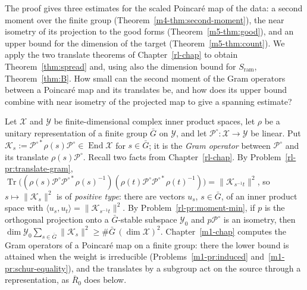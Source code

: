 \documentclass[reqno]{amsart}
\newcounter{chap}
\theoremstyle{definition}
\theoremstyle{plain}
\theoremstyle{remark}
\newcommand{\Xc}{\mathcal X}
\newcommand{\Yc}{\mathcal Y}
\newcommand{\Kc}{\mathcal K}
\newcommand{\Pc}{\mathcal P}
\newcommand{\Gb}{\bar G}
\newcommand{\Rb}{\bar R_0}
\newcommand{\Tr}{\operatorname{Tr}}
\newcommand{\Sr}{S_{\mathrm{ram}}}
\begin{document}
The proof gives three estimates for the scaled Poincar\'e map of the data: a second moment over the finite group (Theorem~\ref{m4-thm:second-moment}), the near isometry of its projection to the good forms (Theorem~\ref{m5-thm:good}), and an upper bound for the dimension of the target (Theorem~\ref{m5-thm:count}).  We apply the two translate theorems of Chapter~\ref{rl-chap} to obtain Theorem~\ref{thm:spread} and, using also the dimension bound for \(\Sr\), Theorem~\ref{thm:B}.  How small can the second moment of the Gram operators between a Poincar\'e map and its translates be, and how does its upper bound combine with near isometry of the projected map to give a spanning estimate?

Let \(\Xc\) and \(\Yc\) be finite-dimensional complex inner product spaces, let \(\rho\) be a unitary representation of a finite group \(\Gb\) on \(\Yc\), and let \(\Pc^\circ\colon\Xc\to\Yc\) be linear.  Put \(\Kc_s:=\Pc^{\circ*}\rho(s)\Pc^\circ\in\operatorname{End}\Xc\) for \(s\in\Gb\); it is the \emph{Gram operator} between \(\Pc^\circ\) and its translate \(\rho(s)\Pc^\circ\).  Recall two facts from Chapter~\ref{rl-chap}.  By Problem~\ref{rl-pr:translate-gram}, \(\Tr\bigl((\rho(s)\Pc^\circ\Pc^{\circ*}\rho(s)^{-1})(\rho(t)\Pc^\circ\Pc^{\circ*}\rho(t)^{-1})\bigr)=\lVert\Kc_{s^{-1}t}\rVert^2\), so \(s\mapsto\lVert\Kc_s\rVert^2\) is of \emph{positive type}: there are vectors \(u_s\), \(s\in\Gb\), of an inner product space with \(\langle u_s,u_t\rangle=\lVert\Kc_{s^{-1}t}\rVert^2\).  By Problem~\ref{rl-pr:moment-min}, if \(p\) is the orthogonal projection onto a \(\Gb\)-stable subspace \(\Yc_0\) and \(p\Pc^\circ\) is an isometry, then \(\dim\Yc_0\sum_{s\in\Gb}\lVert\Kc_s\rVert^2\ge\#\Gb\,(\dim\Xc)^2\).  Chapter~\ref{m1-chap} computes the Gram operators of a Poincar\'e map on a finite group: there the lower bound is attained when the weight is irreducible (Problems~\ref{m1-pr:induced} and~\ref{m1-pr:schur-equality}), and the translates by a subgroup act on the source through a representation, as \(\Rb\) does below.
\end{document}
